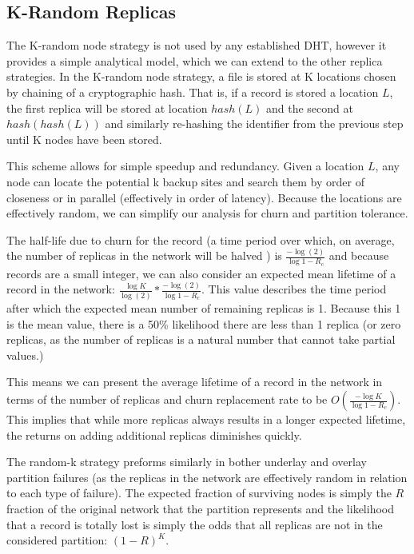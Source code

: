 \documentclass[conference]{IEEEtran}
\begin{document}
\subsection{K-Random Replicas}
The K-random node strategy is not used by any established DHT, however it provides a simple analytical model, which we can extend to the other replica strategies.
In the K-random node strategy, a file is stored at K locations chosen by chaining of a cryptographic hash.
That is, if a record is stored a location $L$, the first replica will be stored at location $hash(L)$ and the second at $hash(hash(L))$ and similarly re-hashing the identifier from the previous step until K nodes have been stored.

This scheme allows for simple speedup and redundancy.
Given a location $L$, any node can locate the potential k backup sites and search them by order of closeness or in parallel (effectively in order of latency).
Because the locations are effectively random, we can simplify our analysis for churn and partition tolerance.

The half-life due to churn for the record (a time period over which, on average, the number of replicas in the network will be halved ) is $\frac{-\log(2)}{\log{1-R_{c}}}$ and because records are a small integer, we can also consider an expected mean lifetime of a record in the network: $\frac{\log{K}}{\log(2)} * \frac{-\log(2)}{\log{1-R_{c}}}$. This value describes the time period after which the expected mean number of remaining replicas is 1. Because this 1 is the mean value, there is a 50\% likelihood there are less than 1 replica (or zero replicas, as the number of replicas is a natural number that cannot take partial values.)

This means we can present the average lifetime of a record in the network in terms of the number of replicas and churn replacement rate to be $O(\frac{-\log{K}}{\log{1-R_{c}}})$.
This implies that while more replicas always results in a longer expected lifetime, the returns on adding additional replicas diminishes quickly.

The random-k strategy preforms similarly in bother underlay and overlay partition failures (as the replicas in the network are effectively random in relation to each type of failure).
The expected fraction of surviving nodes is simply the $R$ fraction of the original network that the partition represents and the likelihood that a record is totally lost is simply the odds that all replicas are not in the considered partition: $(1-R)^{K}$. 
\end{document}
